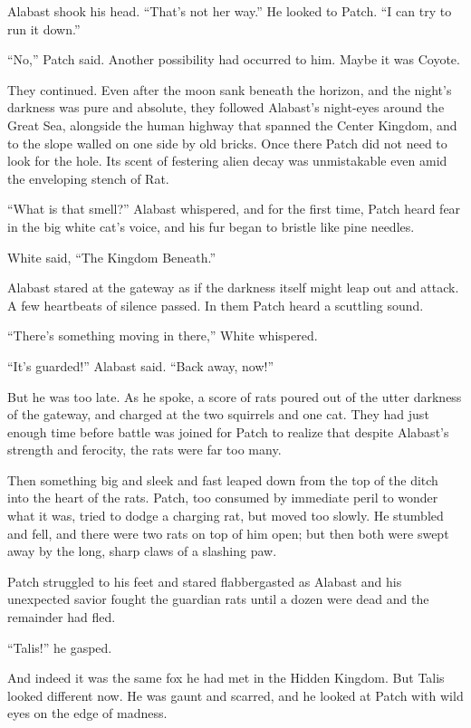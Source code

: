 \documentclass[ebook,oneside,openany,17pt]{memoir}
\newenvironment{tolerant}[1]{%
  \par\tolerance=#1\relax
}{%
  \par
}
\begin{document}
Alabast shook his head. “That’s not her way.” He looked to Patch. “I
can try to run it down.”

“No,” Patch said. Another possibility had occurred to him. Maybe it
was Coyote.

\begin{tolerant}{1000}
They continued. Even after the moon sank beneath the horizon, and the
night’s darkness was pure and absolute, they followed Alabast’s
night-eyes around the Great Sea, alongside the human highway that
spanned the Center Kingdom, and to the slope walled on one side by old
bricks. Once there Patch did not need to look for the hole. Its scent
of festering alien decay was unmistakable even amid the enveloping
stench of Rat.
\end{tolerant}

“What is that smell?” Alabast whispered, and for the first time, Patch
heard fear in the big white cat’s voice, and his fur began to bristle
like pine needles.

White said, “The Kingdom Beneath.”

Alabast stared at the gateway as if the darkness itself might leap out
and attack. A few heartbeats of silence passed. In them Patch heard a
scuttling sound.

“There’s something moving in there,” White whispered.

“It’s guarded!” Alabast said. “Back away, now!”

But he was too late. As he spoke, a score of rats poured out of the
utter darkness of the gateway, and charged at the two squirrels and
one cat. They had just enough time before battle was joined for Patch
to realize that despite Alabast’s strength and ferocity, the rats were
far too many.

Then something big and sleek and fast leaped down from the top of the
ditch into the heart of the rats. Patch, too consumed by immediate
peril to wonder what it was, tried to dodge a charging rat, but moved
too slowly. He stumbled and fell, and there were two rats on top of
him open; but then both were swept away by the long, sharp claws of a
slashing paw.

Patch struggled to his feet and stared flabbergasted as Alabast and
his unexpected savior fought the guardian rats until a dozen were dead
and the remainder had fled.

“Talis!” he gasped.

And indeed it was the same fox he had met in the Hidden Kingdom. But
Talis looked different now. He was gaunt and scarred, and he looked at
Patch with wild eyes on the edge of madness.
\end{document}
